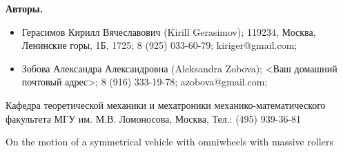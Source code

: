 {\bf Авторы.}

\begin{itemize}
    \item Герасимов Кирилл Вячеславович (Kirill Gerasimov); 119234, Москва, Ленинские горы, 1Б, 1725; 8 (925) 033-60-79; kiriger@gmail.com;
    \item Зобова Александра Александровна (Aleksandra Zobova); <Ваш домашний почтовый адрес>; 8 (916) 333-19-78; azobova@gmail.com;
\end{itemize}
    
    Кафедра теоретической механики и мехатроники механико-математического факультета МГУ им. М.В. Ломоносова, Москва, Тел.: (495) 939-36-81
    
    On the motion of a symmetrical vehicle with omniwheels with massive rollers
    
